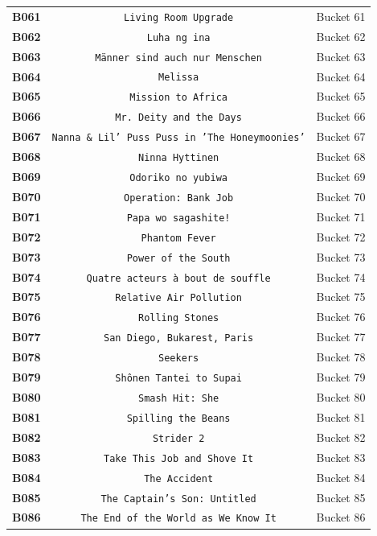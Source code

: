 \documentclass[11pt,a4paper]{article}
\begin{document}
{{\begin{xltabular}{\textwidth}{l | C | C}
\textbf{B061} & \texttt{Living Room Upgrade} & Bucket 61 \\
\textbf{B062} & \texttt{Luha ng ina} & Bucket 62 \\
\textbf{B063} & \texttt{Männer sind auch nur Menschen} & Bucket 63 \\
\textbf{B064} & \texttt{Melissa} & Bucket 64 \\
\textbf{B065} & \texttt{Mission to Africa} & Bucket 65 \\
\textbf{B066} & \texttt{Mr. Deity and the Days} & Bucket 66 \\
\textbf{B067} & \texttt{Nanna \& Lil' Puss Puss in 'The Honeymoonies'} & Bucket 67 \\
\textbf{B068} & \texttt{Ninna Hyttinen} & Bucket 68 \\
\textbf{B069} & \texttt{Odoriko no yubiwa} & Bucket 69 \\
\textbf{B070} & \texttt{Operation: Bank Job} & Bucket 70 \\
\textbf{B071} & \texttt{Papa wo sagashite!} & Bucket 71 \\
\textbf{B072} & \texttt{Phantom Fever} & Bucket 72 \\
\textbf{B073} & \texttt{Power of the South} & Bucket 73 \\
\textbf{B074} & \texttt{Quatre acteurs à bout de souffle} & Bucket 74 \\
\textbf{B075} & \texttt{Relative Air Pollution} & Bucket 75 \\
\textbf{B076} & \texttt{Rolling Stones} & Bucket 76 \\
\textbf{B077} & \texttt{San Diego, Bukarest, Paris} & Bucket 77 \\
\textbf{B078} & \texttt{Seekers} & Bucket 78 \\
\textbf{B079} & \texttt{Shônen Tantei to Supai} & Bucket 79 \\
\textbf{B080} & \texttt{Smash Hit: She} & Bucket 80 \\
\textbf{B081} & \texttt{Spilling the Beans} & Bucket 81 \\
\textbf{B082} & \texttt{Strider 2} & Bucket 82 \\
\textbf{B083} & \texttt{Take This Job and Shove It} & Bucket 83 \\
\textbf{B084} & \texttt{The Accident} & Bucket 84 \\
\textbf{B085} & \texttt{The Captain's Son: Untitled} & Bucket 85 \\
\textbf{B086} & \texttt{The End of the World as We Know It} & Bucket 86 \\

\end{xltabular}}}
\end{document}
